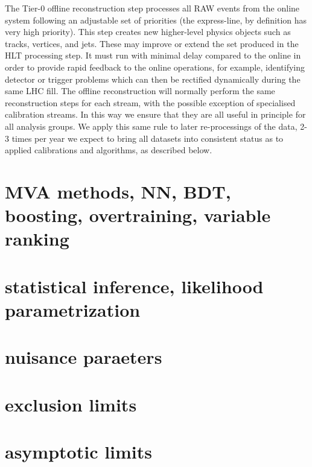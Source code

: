 The Tier-0 offline reconstruction step processes all RAW events from the online system following
an adjustable set of priorities (the express-line, by definition has very high priority). This step
creates new higher-level physics objects such as tracks, vertices, and jets. These may improve or
extend the set produced in the HLT processing step. It must run with minimal delay compared
to the online in order to provide rapid feedback to the online operations, for example, identifying
detector or trigger problems which can then be rectified dynamically during the same LHC fill.
The offline reconstruction will normally perform the same reconstruction steps for each stream,
with the possible exception of specialised calibration streams. In this way we ensure that they
are all useful in principle for all analysis groups. We apply this same rule to later re-processings
of the data, 2-3 times per year we expect to bring all datasets into consistent status as to applied
calibrations and algorithms, as described below.





\section{ MVA methods, NN, BDT, boosting, overtraining, variable ranking  }
\section{statistical inference, likelihood parametrization}
\section{ nuisance paraeters}
\section{exclusion limits }
\section{asymptotic limits }












